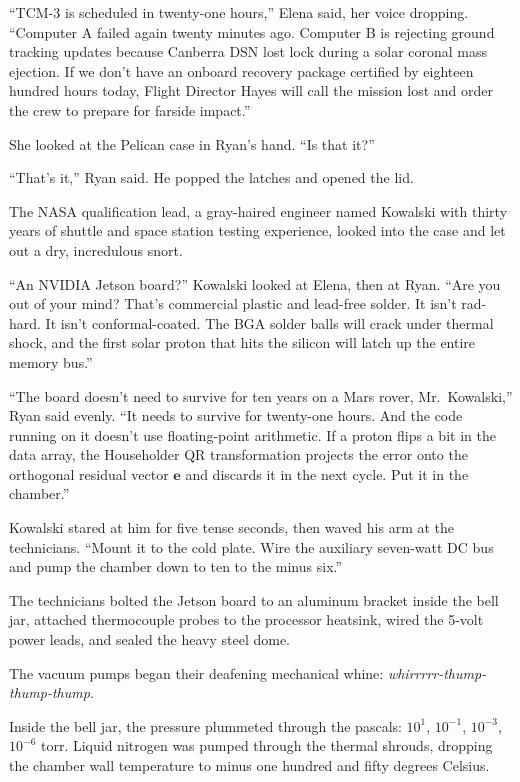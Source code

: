 \documentclass[12pt,twoside,openright]{book}
\begin{document}
``TCM-3 is scheduled in twenty-one hours,'' Elena said, her voice
dropping. ``Computer A failed again twenty minutes ago. Computer B is
rejecting ground tracking updates because Canberra DSN lost lock during
a solar coronal mass ejection. If we don't have an onboard recovery
package certified by eighteen hundred hours today, Flight Director Hayes
will call the mission lost and order the crew to prepare for farside
impact.''

She looked at the Pelican case in Ryan's hand. ``Is that it?''

``That's it,'' Ryan said. He popped the latches and opened the lid.

The NASA qualification lead, a gray-haired engineer named Kowalski with
thirty years of shuttle and space station testing experience, looked
into the case and let out a dry, incredulous snort.

``An NVIDIA Jetson board?'' Kowalski looked at Elena, then at Ryan.
``Are you out of your mind? That's commercial plastic and lead-free
solder. It isn't rad-hard. It isn't conformal-coated. The BGA solder
balls will crack under thermal shock, and the first solar proton that
hits the silicon will latch up the entire memory bus.''

``The board doesn't need to survive for ten years on a Mars rover,
Mr.~Kowalski,'' Ryan said evenly. ``It needs to survive for twenty-one
hours. And the code running on it doesn't use floating-point arithmetic.
If a proton flips a bit in the data array, the Householder QR
transformation projects the error onto the orthogonal residual vector
\(\mathbf{e}\) and discards it in the next cycle. Put it in the
chamber.''

Kowalski stared at him for five tense seconds, then waved his arm at the
technicians. ``Mount it to the cold plate. Wire the auxiliary seven-watt
DC bus and pump the chamber down to ten to the minus six.''

The technicians bolted the Jetson board to an aluminum bracket inside
the bell jar, attached thermocouple probes to the processor heatsink,
wired the 5-volt power leads, and sealed the heavy steel dome.

The vacuum pumps began their deafening mechanical whine:
\emph{whirrrrr-thump-thump-thump}.

Inside the bell jar, the pressure plummeted through the pascals:
\(10^1\), \(10^{-1}\), \(10^{-3}\), \(10^{-6}\) torr. Liquid nitrogen
was pumped through the thermal shrouds, dropping the chamber wall
temperature to minus one hundred and fifty degrees Celsius.
\end{document}
